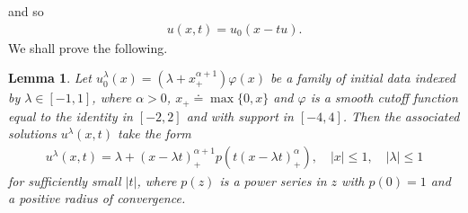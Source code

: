 \documentclass[12pt,reqno]{amsart}
\numberwithin{equation}{section}  %
\numberwithin{figure}{section}
\newcommand{\vp}{\varphi}
\newtheorem{lemma}[theorem]{Lemma}
\begin{document}
%
%
and so
%
%
%
%
\begin{equation*}
\begin{split}
u(x,t) = u_{0}(x - tu).
\end{split}
\end{equation*}
%
%
We shall prove the following.
%
%
%
%
%
%
%
%
\begin{lemma}
%
Let $u_{0}^{\lambda}(x) = (\lambda +
x_{+}^{\alpha + 1}) \vp(x)$ be a family of initial data indexed by $\lambda \in
[-1, 1]$, where $\alpha > 0$, $x_{+} \doteq \max\{0, x\}$ and $\vp$ is a smooth cutoff
function equal to the identity in $[-2, 2]$ and with support in $[-4,4]$. Then the associated solutions $u^{\lambda}(x,t)$ take the form
\begin{equation}
    \label{u-lam-explicit-form}
    \begin{split}
        u^{\lambda}(x,t) = \lambda + (x - \lambda t)^{\alpha + 1}_{+} p(t(x- \lambda t)^{\alpha}_{+}), \quad | x | \le 1, \quad | \lambda | \le 1
    \end{split}
\end{equation}
%
%
for sufficiently small $| t |$, where $p(z)$ is a power series in $z$ with $p(0) =1$ and a positive radius of convergence.
\label{lem:sol-burg}
\end{lemma}
%
%
%
%
\end{document}
